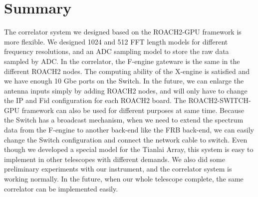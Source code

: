 \documentclass{ws-jai}
\begin{document}
\section{Summary}\label{sec:summary}	
The correlator system we designed based on the ROACH2-GPU framework is more flexible. We designed 1024 and 512 FFT length models for different frequency resolutions, and an ADC sampling model to store the raw data sampled by ADC. In the correlator, the F-engine gateware is the same in the different ROACH2 nodes. The computing ability of the X-engine is satisfied and we have enough 10 Gbe ports on the Switch. In the future, we can enlarge the antenna inputs simply by adding ROACH2 nodes, and will only have to change the IP and Fid configuration for each ROACH2 board. The ROACH2-SWITCH-GPU framework can also be used for different purposes at same time. Because the Switch has a broadcast mechanism, when we need to extend the spectrum data from the F-engine to another back-end like the FRB back-end, we can easily change the Switch configuration and connect the network cable to switch. Even though we developed a special model for the Tianlai Array, this system is easy to implement in other telescopes with different demands. We also did some preliminary experiments with our instrument, and the correlator system is working normally. In the future, when our whole telescope complete, the same correlator can be implemented easily. 




\end{document}
